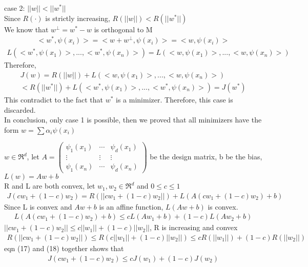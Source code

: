 \documentclass{article}
\newenvironment{sub}[2][$-$]{\begin{trivlist}
		\item[\hskip \labelsep {\bfseries #1}\hskip \labelsep {\bfseries #2.}]}  {\end{trivlist}}
\begin{document}
case 2: $||w|| < ||w^*||$\\
Since $R(\cdot)$ is strictly increasing, $R(||w||) < R(||w^*||)$\\
We know that $w^\perp  = w^* - w$ is orthogonal to M 
\begin{align}
<w^*,\psi(x_i)> = <w+ w^\perp,\psi(x_i)> = <w,\psi(x_i)>
\end{align}\begin{align}
L(<w^*,\psi(x_1)>,...,<w^*,\psi(x_n)>) = L(<w,\psi(x_1)>,...,<w,\psi(x_n)>)
\end{align}
Therefore, 
\begin{align}
J(w)   = R(||w||) + L(<w,\psi(x_1)>,...,<w,\psi(x_n)>) \\< R(||w^*||) + L(<w^*,\psi(x_1)>,...,<w^*,\psi(x_n)>) = J(w^*)
\end{align}
This contradict to the fact that $w^*$ is a minimizer. Therefore, this case is discarded.\\
In conclusion, only case 1 is possible, then we proved that all minimizers have the form $w = \sum\alpha_i\psi(x_i) $
\pagebreak


\begin{sub}{7.3}
\end{sub}
$w \in \Re^d$, let $A = \begin{pmatrix}
\psi_1(x_1)& \cdots &\psi_d(x_1)\\
\vdots &\vdots &\vdots\\
\psi_1(x_n)&\cdots & \psi_d(x_n)
\end{pmatrix}$ be the design matrix, b be the bias,$L(w) = Aw + b$\\
R and L are both convex, let $w_1, w_2 \in \Re^d$ and $0 \leq c \leq1$
\begin{align}
J(cw_1 + (1-c)w_2) = R(||cw_1 + (1-c)w_2||) + L(A(cw_1+(1-c)w_2)+b)
\end{align}
Since L is convex and $Aw+b$ is an affine function, $L(Aw+b)$ is convex.
\begin{align}
L(A(cw_1+(1-c)w_2)+b) \leq cL(Aw_1 +b)  + (1-c)L(Aw_2 +b)\end{align}
$||cw_1 + (1-c)w_2|| \leq c ||w_1|| + (1-c)||w_2||$, R is increasing and convex
\begin{align}
R(||cw_1 + (1-c)w_2||) \leq R(c ||w_1|| + (1-c)||w_2||) \leq cR(||w_1||) + (1- c)R(||w_2||)
\end{align}
eqn (17) and (18) together shows that 
\begin{align}
J(cw_1 + (1-c)w_2)  \leq cJ(w_1)+ (1-c)J(w_2)
\end{align}
\end{document}
